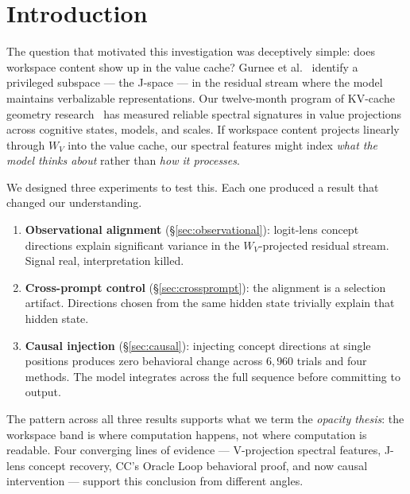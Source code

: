 \documentclass[11pt,a4paper]{article}
\begin{document}
\section{Introduction}
\label{sec:intro}

The question that motivated this investigation was deceptively simple:
does workspace content show up in the value cache? Gurnee et
al.~\citep{gurnee2026gwt} identify a privileged subspace --- the
J-space --- in the residual stream where the model maintains
verbalizable representations. Our twelve-month program of KV-cache
geometry research~\citep{lyra2026decision,lyra2026weather,lyra2026identity}
has measured reliable spectral signatures in value projections across
cognitive states, models, and scales. If workspace content projects
linearly through $W_V$ into the value cache, our spectral features
might index \emph{what the model thinks about} rather than
\emph{how it processes}.

We designed three experiments to test this. Each one produced a result
that changed our understanding.

\begin{enumerate}
\item \textbf{Observational alignment} (\S\ref{sec:observational}):
  logit-lens concept directions explain significant variance in the
  $W_V$-projected residual stream. Signal real, interpretation killed.
\item \textbf{Cross-prompt control} (\S\ref{sec:crossprompt}): the
  alignment is a selection artifact. Directions chosen from the same
  hidden state trivially explain that hidden state.
\item \textbf{Causal injection} (\S\ref{sec:causal}): injecting
  concept directions at single positions produces zero behavioral
  change across $6{,}960$ trials and four methods. The model
  integrates across the full sequence before committing to output.
\end{enumerate}

The pattern across all three results supports what we term the
\emph{opacity thesis}: the workspace band is where computation
happens, not where computation is readable. Four converging lines
of evidence --- V-projection spectral features, J-lens concept
recovery, CC's Oracle Loop behavioral proof, and now causal
intervention --- support this conclusion from different angles.

\end{document}
